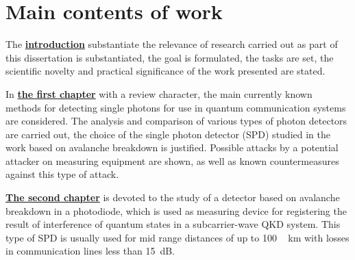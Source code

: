 

 \section*{Main contents of work}
 The \underline{\textbf{introduction}} substantiate the relevance of research carried out as part of this dissertation is substantiated, the goal is formulated, the tasks are set, the scientific novelty and practical significance of the work presented are stated.

 In \underline{\textbf{the first chapter}} with a review character, the main currently known methods for detecting single photons for use in quantum communication systems are considered. The analysis and comparison of various types of photon detectors are carried out, the choice of the single photon detector (SPD) studied in the work based on avalanche breakdown is justified. Possible attacks by a potential attacker on measuring equipment are shown, as well as known countermeasures against this type of attack.



 \underline{\textbf{The second chapter}} is devoted to the study of a detector based on avalanche breakdown in a photodiode, which is used as measuring device for registering the result of interference of quantum states in a subcarrier-wave QKD system. This type of SPD is usually used for mid range distances of up to 100 ~ km with losses in communication lines less than 15~dB.

